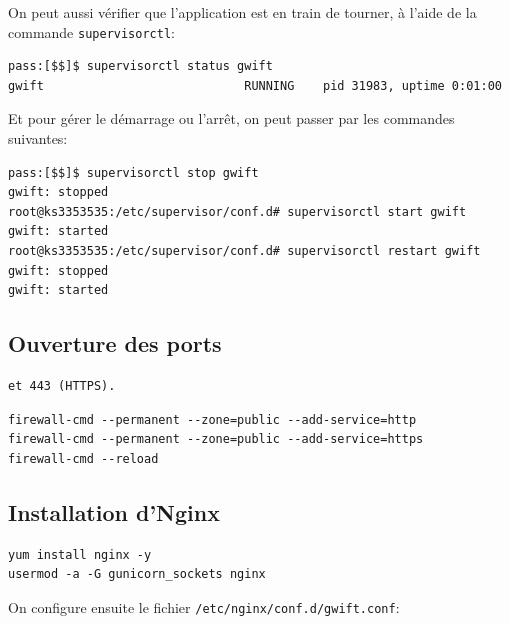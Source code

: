 \documentclass[11pt]{amsbook}
\begin{document}
On peut aussi vérifier que l’application est en train de tourner, à l’aide de la commande \texttt{supervisorctl}:


\begin{verbatim}
pass:[$$]$ supervisorctl status gwift
gwift                            RUNNING    pid 31983, uptime 0:01:00
\end{verbatim}

Et pour gérer le démarrage ou l’arrêt, on peut passer par les commandes suivantes:


\begin{verbatim}
pass:[$$]$ supervisorctl stop gwift
gwift: stopped
root@ks3353535:/etc/supervisor/conf.d# supervisorctl start gwift
gwift: started
root@ks3353535:/etc/supervisor/conf.d# supervisorctl restart gwift
gwift: stopped
gwift: started
\end{verbatim}

\hypertarget{x-ouverture-des-ports}{\subsection{Ouverture des ports}}
\begin{verbatim}
et 443 (HTTPS).
\end{verbatim}

\begin{verbatim}
firewall-cmd --permanent --zone=public --add-service=http 
firewall-cmd --permanent --zone=public --add-service=https 
firewall-cmd --reload
\end{verbatim}


\hypertarget{x-installation-d’nginx}{\subsection{Installation d’Nginx}}
\begin{verbatim}
yum install nginx -y
usermod -a -G gunicorn_sockets nginx
\end{verbatim}

On configure ensuite le fichier \texttt{/etc/nginx/conf.d/gwift.conf}:
\end{document}

